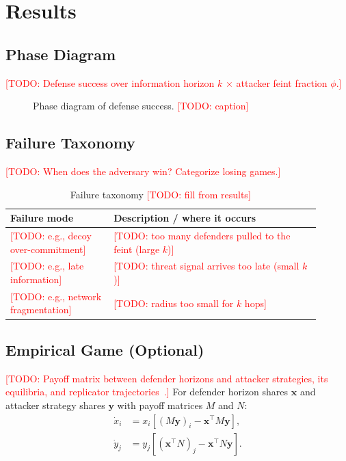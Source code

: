 \documentclass[conference]{IEEEtran}
\newcommand{\todo}[1]{\textcolor{red}{[TODO: #1]}}
\newcommand{\placeholderfig}[2]{%
  \fbox{\parbox[c][#1][c]{0.95\linewidth}{\centering\small\textcolor{gray}{#2}}}}
\newcommand{\hor}{k}           %
\newcommand{\feint}{\phi}      %
\begin{document}
\section{Results}
\label{sec:results}

\subsection{Phase Diagram}
\todo{Defense success over information horizon $\hor$ $\times$ attacker feint fraction $\feint$.}

\begin{figure}[t]
  \centering
  \placeholderfig{5cm}{Figure (headline): defense success over $k$ (x-axis) $\times$ feint fraction $\phi$ (y-axis)}
  \caption{Phase diagram of defense success. \todo{caption}}
  \label{fig:phase}
\end{figure}

\subsection{Failure Taxonomy}
\todo{When does the adversary win? Categorize losing games.}

\begin{table}[t]
  \centering
  \caption{Failure taxonomy \todo{fill from results}}
  \label{tab:failures}
  \begin{tabular}{@{}p{0.3\linewidth}p{0.6\linewidth}@{}}
    \toprule
    Failure mode & Description / where it occurs \\
    \midrule
    \todo{e.g., decoy over-commitment} & \todo{too many defenders pulled to the feint (large $\hor$)} \\
    \todo{e.g., late information}      & \todo{threat signal arrives too late (small $\hor$)} \\
    \todo{e.g., network fragmentation} & \todo{radius too small for $\hor$ hops} \\
    \bottomrule
  \end{tabular}
\end{table}

\subsection{Empirical Game (Optional)}
\label{sec:empirical-game}
\todo{Payoff matrix between defender horizons and attacker strategies, its equilibria, and replicator trajectories~\cite{bloembergen2015evolutionary,taylor1978ess}.}
For defender horizon shares $\mathbf{x}$ and attacker strategy shares $\mathbf{y}$ with payoff matrices $M$ and $N$:
\begin{align}
  \dot{x}_i &= x_i \left[ (M\mathbf{y})_i - \mathbf{x}^\top M \mathbf{y} \right], \\
  \dot{y}_j &= y_j \left[ (\mathbf{x}^\top N)_j - \mathbf{x}^\top N \mathbf{y} \right].
\end{align}
\end{document}
